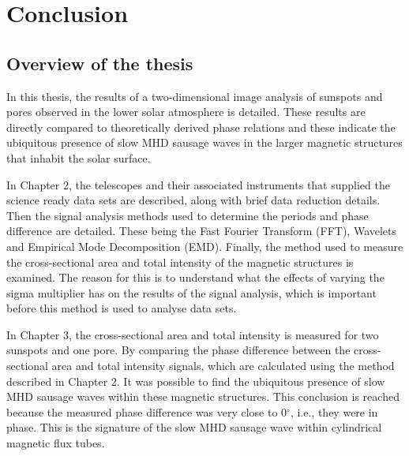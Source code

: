 \graphicspath{{Chapter6/Figs/}}

\chapter{Conclusion}
    
    \vspace*{\fill}\par
    \pagebreak

\section{Overview of the thesis}
    
	In this thesis, the results of a two-dimensional image analysis of sunspots and pores observed in the lower solar atmosphere is detailed.
    These results are directly compared to theoretically derived phase relations and these indicate the ubiquitous presence of slow MHD sausage waves in the larger magnetic structures that inhabit the solar surface.
    
    In Chapter 2, the telescopes and their associated instruments that supplied the science ready data sets are described, along with brief data reduction details.
    Then the signal analysis methods used to determine the periods and phase difference are detailed.
    These being the Fast Fourier Transform (FFT), Wavelets and Empirical Mode Decomposition (EMD).
    Finally, the method used to measure the cross-sectional area and total intensity of the magnetic structures is examined.
    The reason for this is to understand what the effects of varying the sigma multiplier has on the results of the signal analysis, which is important before this method is used to analyse data sets.
    
    In Chapter 3, the cross-sectional area and total intensity is measured for two sunspots and one pore.
    By comparing the phase difference between the cross-sectional area and total intensity signals, which are calculated using the method described in Chapter 2.
    It was possible to find the ubiquitous presence of slow MHD sausage waves within these magnetic structures.
    This conclusion is reached because the measured phase difference was very close to 0$^\circ$, i.e., they were in phase.
    This is the signature of the slow MHD sausage wave within cylindrical magnetic flux tubes.
    
